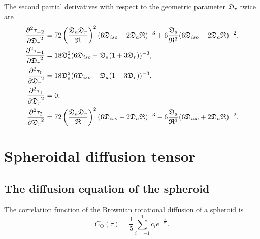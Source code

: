 The second partial derivatives with respect to the geometric parameter $\mathfrak{D}_r$ twice are
\begin{subequations}
\begin{align}
    \frac{\partial^2 \tau_{-2}}{{\partial \mathfrak{D}_r}^2} &=
        72 \left( \frac{\mathfrak{D}_a \mathfrak{D}_r}{\mathfrak{R}} \right)^2 (6\mathfrak{D}_{iso} - 2\mathfrak{D}_a\mathfrak{R})^{-3}
        + 6 \frac{\mathfrak{D}_a}{\mathfrak{R}^3} (6\mathfrak{D}_{iso} - 2\mathfrak{D}_a\mathfrak{R})^{-2}, \\
    \frac{\partial^2 \tau_{-1}}{{\partial \mathfrak{D}_r}^2} &= 18\mathfrak{D}_a^2 (6\mathfrak{D}_{iso} - \mathfrak{D}_a (1 + 3\mathfrak{D}_r))^{-3}, \\
    \frac{\partial^2 \tau_{0}}{{\partial \mathfrak{D}_r}^2}  &= 18\mathfrak{D}_a^2 (6\mathfrak{D}_{iso} - \mathfrak{D}_a (1 - 3\mathfrak{D}_r))^{-3}, \\
    \frac{\partial^2 \tau_{1}}{{\partial \mathfrak{D}_r}^2}  &= 0, \\
    \frac{\partial^2 \tau_{2}}{{\partial \mathfrak{D}_r}^2}  &= 
        72 \left( \frac{\mathfrak{D}_a \mathfrak{D}_r}{\mathfrak{R}} \right)^2 (6\mathfrak{D}_{iso} - 2\mathfrak{D}_a\mathfrak{R})^{-3}
        - 6 \frac{\mathfrak{D}_a}{\mathfrak{R}^3} (6\mathfrak{D}_{iso} + 2\mathfrak{D}_a\mathfrak{R})^{-2}.
\end{align}
\end{subequations}





\newpage
\section{Spheroidal diffusion tensor}





\subsection{The diffusion equation of the spheroid} \label{spheroid equation}

The correlation function of the Brownian rotational diffusion of a spheroid is
\begin{equation} \label{eq: spheroid correlation function}
    C_\mathrm{O}(\tau) = \frac{1}{5} \sum^1_{i=-1} c_i e^{-\frac{\tau}{\tau_i}}.
\end{equation}

